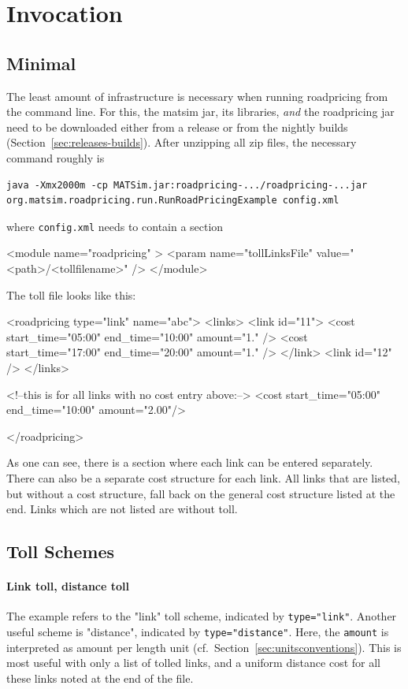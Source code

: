\section{Invocation}
\subsection{Minimal}
The least amount of infrastructure is necessary when running roadpricing from the command line. For this, the \gls{matsim} \gls{jar}, its libraries, \emph{and} the roadpricing \gls{jar} need to be downloaded either from a release or from the nightly builds (Section~\ref{sec:releases-builds}). After unzipping all zip files, the necessary command roughly is
\begin{lstlisting}
java -Xmx2000m -cp MATSim.jar:roadpricing-.../roadpricing-...jar org.matsim.roadpricing.run.RunRoadPricingExample config.xml  
\end{lstlisting}
where \lstinline$config.xml$ needs to contain a section
\begin{xml}
	<module name="roadpricing" >
		<param name="tollLinksFile" value="<path>/<tollfilename>" />
	</module>
\end{xml}
The toll file looks like this:
%
\begin{xml}
<roadpricing type="link" name="abc">
   <links>
      <link id="11">
         <cost start_time="05:00" end_time="10:00" amount="1." />
         <cost start_time="17:00" end_time="20:00" amount="1." />
      </link>             
      <link id="12" />
   </links>

   <!--this is for all links with no cost entry above:-->
   <cost start_time="05:00" end_time="10:00" amount="2.00"/>

</roadpricing>
\end{xml}
%
As one can see, there is a section where each link can be entered separately. There can also be a separate cost structure for each link. All links that are listed, but without a cost structure, fall back on the general cost structure listed at the end. Links which are not listed are without toll.

\subsection{Toll Schemes}
\paragraph{Link toll, distance toll} The example refers to the "link" toll scheme, indicated by \lstinline$type="link"$. Another useful scheme is "distance", indicated by \lstinline$type="distance"$.  Here, the \lstinline$amount$ is interpreted as amount per length unit (cf.\ Section~\ref{sec:unitsconventions}). This is most useful with only a list of tolled links, and a uniform distance cost for all these links noted at the end of the file.

